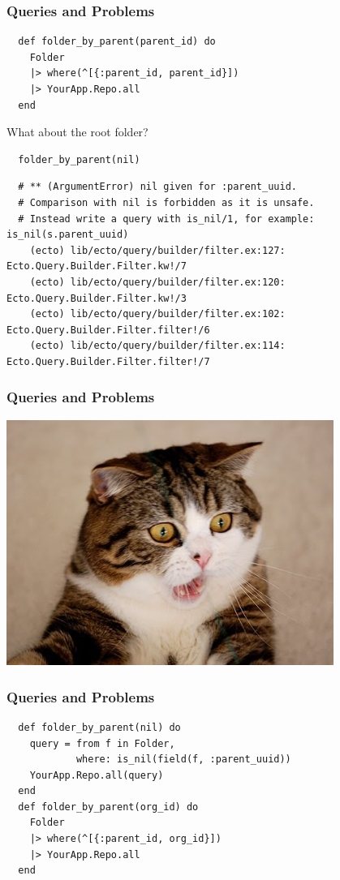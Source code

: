 \documentclass{beamer}
\begin{document}
\begin{frame}[fragile]
\frametitle{Queries and Problems}
\begin{verbatim}
  def folder_by_parent(parent_id) do
    Folder
    |> where(^[{:parent_id, parent_id}])
    |> YourApp.Repo.all
  end
\end{verbatim}
\pause
\centerline{What about the root folder?}
\begin{verbatim}
  folder_by_parent(nil)
\end{verbatim}
\pause
\begin{tiny}
\begin{verbatim}
  # ** (ArgumentError) nil given for :parent_uuid.
  # Comparison with nil is forbidden as it is unsafe.
  # Instead write a query with is_nil/1, for example: is_nil(s.parent_uuid)
    (ecto) lib/ecto/query/builder/filter.ex:127: Ecto.Query.Builder.Filter.kw!/7
    (ecto) lib/ecto/query/builder/filter.ex:120: Ecto.Query.Builder.Filter.kw!/3
    (ecto) lib/ecto/query/builder/filter.ex:102: Ecto.Query.Builder.Filter.filter!/6
    (ecto) lib/ecto/query/builder/filter.ex:114: Ecto.Query.Builder.Filter.filter!/7

\end{verbatim}
\end{tiny}
\end{frame}


\begin{frame}[fragile]
\frametitle{Queries and Problems}
\centerline{\includegraphics[width=0.8\textwidth]{shocked_cat.jpg}}
\end{frame}



\begin{frame}[fragile]
\frametitle{Queries and Problems}
\begin{verbatim}
  def folder_by_parent(nil) do
    query = from f in Folder,
            where: is_nil(field(f, :parent_uuid))
    YourApp.Repo.all(query)
  end
  def folder_by_parent(org_id) do
    Folder
    |> where(^[{:parent_id, org_id}])
    |> YourApp.Repo.all
  end
\end{verbatim}
\end{frame}
\end{document}
